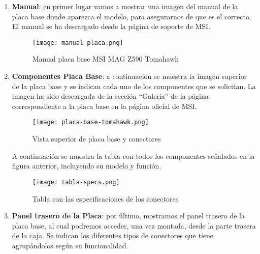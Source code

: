 \begin{enumerate}
    \item \textbf{Manual}: en primer lugar vamos a mostrar una imagen del manual de la placa base donde aparezca el modelo, para asegurarnos de que es el correcto. El manual se ha descargado desde la página de soporte de MSI. \cite{msi01}

    \begin{figure}[ht]
        \centering
        \texttt{[image: manual-placa.png]}
        \caption{Manual placa base MSI MAG Z590 Tomahawk}
    \end{figure}

    \item \textbf{Componentes Placa Base}: a continuación se muestra la imagen superior de la placa base y se indican cada uno de los componentes que se solicitan. La imagen ha sido descargada de la sección ``Galería'' de la página correspondiente a la placa base en la página oficial de MSI. \cite{msi02}

    \begin{figure}[ht]
        \centering
        \texttt{[image: placa-base-tomahawk.png]}
        \caption{Vista superior de placa base y conectores}
    \end{figure}

    A continuación se muestra la tabla con todos los componentes señalados en la figura anterior, incluyendo su modelo y función.

    \begin{figure}[ht]
        \centering
        \texttt{[image: tabla-specs.png]}
        \caption{Tabla con las especificaciones de los conectores}
    \end{figure}

    \item \textbf{Panel trasero de la Placa}: por último, mostramos el panel trasero de la placa base, al cual podremos acceder, una vez montada, desde la parte trasera de la caja. Se indican los diferentes tipos de conectores que tiene agrupándolos según su funcionalidad.

\end{enumerate}




\newpage



